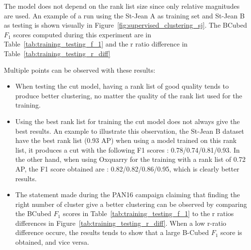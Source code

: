 The model does not depend on the rank list size since only relative magnitudes are used.
An example of a run using the St-Jean A as training set and St-Jean B as testing is shown visually in Figure~\ref{fig:supervised_clustering_sj}.
The BCubed $F_1$ scores computed during this experiment are in Table~\ref{tab:training_testing_f_1} and the r ratio difference
in Table~\ref{tab:training_testing_r_diff}

Multiple points can be observed with these results:
\begin{itemize}
  \item
  When testing the cut model, having a rank list of good quality tends to produce better clustering, no matter the quality of the rank list used for the training.
  \item
  Using the best rank list for training the cut model does not always give the best results.
  An example to illustrate this observation, the St-Jean B dataset have the best rank list (0.93 AP) when using a model trained on this rank list, it produces a cut with the following F1 scores : 0.78/0.74/0.81/0.93.
  In the other hand, when using Oxquarry for the training with a rank list of 0.72 AP, the F1 score obtained are : 0.82/0.82/0.86/0.95, which is clearly better results.
  \item
  The statement made during the PAN16 campaign claiming that finding the right number of cluster give a better clustering can be observed by comparing the BCubed $F_1$ scores in Table~\ref{tab:training_testing_f_1} to the r ratios differences in Figure~\ref{tab:training_testing_r_diff}.
  When a low r-ratio difference occure, the results tends to show that a large B-Cubed $F_1$ score is obtained, and vice versa.
\end{itemize}

